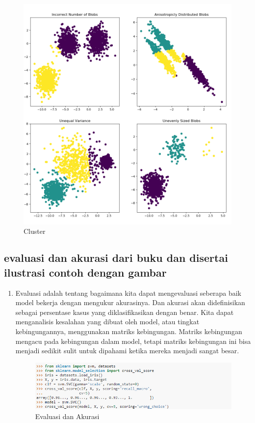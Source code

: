 \begin{enumerate}
\begin{figure}[ht]
\includegraphics[scale=0.5]{figures/wiendh4.png}
\caption{Cluster}
\label{contoh}
\end{figure}
\end{enumerate}

\subsection{evaluasi dan akurasi dari buku dan disertai ilustrasi contoh
dengan gambar}
\begin{enumerate}
\item Evaluasi adalah tentang  bagaimana kita dapat mengevaluasi seberapa baik model bekerja dengan mengukur akurasinya. Dan akurasi akan didefinisikan sebagai persentase kasus yang diklasifikasikan dengan benar. Kita dapat menganalisis kesalahan yang dibuat oleh model, atau tingkat kebingungannya, menggunakan matriks kebingungan. Matriks kebingungan mengacu pada kebingungan dalam model, tetapi matriks kebingungan ini bisa menjadi sedikit sulit untuk dipahami ketika mereka menjadi sangat besar.
\begin{figure}[ht]
\centering
\includegraphics[scale=0.5]{figures/wiendh9.png}
\caption{ Evaluasi dan Akurasi}
\label{contoh}
\end{figure}
\end{enumerate}

